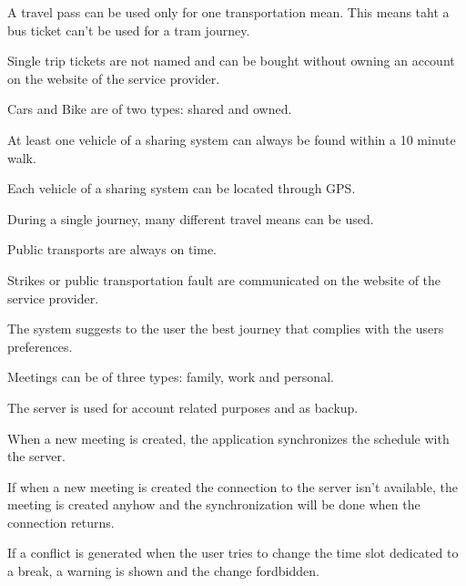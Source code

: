 \begin{list}
\item
A travel pass can be used only for one transportation mean. This means taht a bus ticket can't be used for a tram journey.
\item
Single trip tickets are not named and can be bought without owning an account on the website of the service provider.
\item
Cars and Bike are of two types: shared and owned.
\item
At least one vehicle of a sharing system can always be found within a 10 minute walk.
\item
Each vehicle of a sharing system can be located through GPS.
\item
During a single journey, many different travel means can be used.
\item
Public transports are always on time.
\item
Strikes or public transportation fault are communicated on the website of the service provider. 
\item
The system suggests to the user the best journey that complies with the users preferences.
\item
Meetings can be of three types: family, work and personal.
\item
The server is used for account related purposes and as backup.
\item
When a new meeting is created, the application synchronizes the schedule with the server.
\item
If when a new meeting is created the connection to the server isn't available, the meeting is created anyhow and the synchronization will be done when the connection returns.
\item
If a conflict is generated when the user tries to change the time slot dedicated to a break, a warning is shown and the change fordbidden.
\end{list}